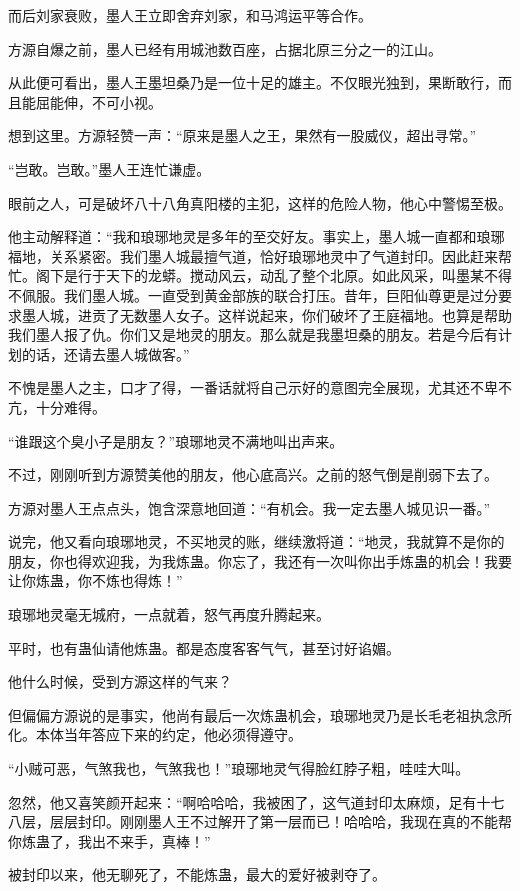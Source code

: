 \begin{this_body}
而后刘家衰败，墨人王立即舍弃刘家，和马鸿运平等合作。

方源自爆之前，墨人已经有用城池数百座，占据北原三分之一的江山。

从此便可看出，墨人王墨坦桑乃是一位十足的雄主。不仅眼光独到，果断敢行，而且能屈能伸，不可小视。

想到这里。方源轻赞一声：“原来是墨人之王，果然有一股威仪，超出寻常。”

“岂敢。岂敢。”墨人王连忙谦虚。

眼前之人，可是破坏八十八角真阳楼的主犯，这样的危险人物，他心中警惕至极。

他主动解释道：“我和琅琊地灵是多年的至交好友。事实上，墨人城一直都和琅琊福地，关系紧密。我们墨人城最擅气道，恰好琅琊地灵中了气道封印。因此赶来帮忙。阁下是行于天下的龙蟒。搅动风云，动乱了整个北原。如此风采，叫墨某不得不佩服。我们墨人城。一直受到黄金部族的联合打压。昔年，巨阳仙尊更是过分要求墨人城，进贡了无数墨人女子。这样说起来，你们破坏了王庭福地。也算是帮助我们墨人报了仇。你们又是地灵的朋友。那么就是我墨坦桑的朋友。若是今后有计划的话，还请去墨人城做客。”

不愧是墨人之主，口才了得，一番话就将自己示好的意图完全展现，尤其还不卑不亢，十分难得。

“谁跟这个臭小子是朋友？”琅琊地灵不满地叫出声来。

不过，刚刚听到方源赞美他的朋友，他心底高兴。之前的怒气倒是削弱下去了。

方源对墨人王点点头，饱含深意地回道：“有机会。我一定去墨人城见识一番。”

说完，他又看向琅琊地灵，不买地灵的账，继续激将道：“地灵，我就算不是你的朋友，你也得欢迎我，为我炼蛊。你忘了，我还有一次叫你出手炼蛊的机会！我要让你炼蛊，你不炼也得炼！”

琅琊地灵毫无城府，一点就着，怒气再度升腾起来。

平时，也有蛊仙请他炼蛊。都是态度客客气气，甚至讨好谄媚。

他什么时候，受到方源这样的气来？

但偏偏方源说的是事实，他尚有最后一次炼蛊机会，琅琊地灵乃是长毛老祖执念所化。本体当年答应下来的约定，他必须得遵守。

“小贼可恶，气煞我也，气煞我也！”琅琊地灵气得脸红脖子粗，哇哇大叫。

忽然，他又喜笑颜开起来：“啊哈哈哈，我被困了，这气道封印太麻烦，足有十七八层，层层封印。刚刚墨人王不过解开了第一层而已！哈哈哈，我现在真的不能帮你炼蛊了，我出不来手，真棒！”

被封印以来，他无聊死了，不能炼蛊，最大的爱好被剥夺了。


\end{this_body}
